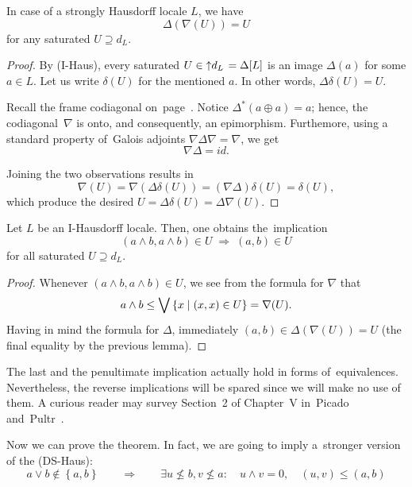 \begin{lem} \label{meets-in-satur}
  In case of a strongly Hausdorff locale $L$, we have
  \[
    \Delta(\nabla(U)) = U
  \]
  for any saturated $U \supseteq d_L$.
\end{lem}
\begin{proof}
  By (I-Haus), every saturated $U\in \left\uparrow d_L \right. = \Delta[L]$ is
  an image $\Delta(a)$ for some $a\in L$.
  Let us write $\delta(U)$ for the mentioned $a$.
  In other words, $\Delta\delta(U) = U$.

  Recall the frame codiagonal on~page~\pageref{codiag-in-Frm}\thinspace.
  Notice $\Delta^*(a \oplus a) = a$;
  hence, the codiagonal~$\nabla$ is onto, and consequently, an epimorphism.
  Furthemore, using a standard property of~Galois adjoints $\nabla \Delta
  \nabla = \nabla$,
  we get
  \[
    \nabla \Delta = id.
  \]

  Joining the two observations results in
  \[
    \nabla (U) = \nabla (\Delta\delta (U)) = (\nabla \Delta)\delta (U) = \delta(U),
  \]
  which produce the desired $U = \Delta \delta (U) = \Delta \nabla (U)$.
\end{proof}

\begin{lem} \label{meets-in-satur}
  Let $L$ be an I-Hausdorff locale.
  Then, one obtains the~implication
  \[
    \left( a \wedge b, a \wedge b \right) \in U
    \; \Rightarrow \;
    \left( a, b \right) \in U
  \]
  for all saturated $U \supseteq d_L$.
\end{lem}
\begin{proof}
  Whenever $(a \wedge b, a \wedge b)\in U$, we see from the formula for
  $\nabla$ that
  \[
    a \wedge b \leq \bigvee \left\{ x \mid (x, x) \in U \right\} = \nabla(U).
  \]
  Having in mind the formula for $\Delta$, immediately $(a, b) \in \Delta( \nabla(U) ) = U$
  (the final equality by the previous lemma).
\end{proof}

\begin{rem}
  The last and the penultimate implication actually hold in forms
  of~equivalences.
  Nevertheless, the reverse implications will be spared since we will make no
  use of them.
  A curious reader may survey Section~2 of Chapter~V in~Picado
  and~Pultr~\cite{picado-pultr12}.
\end{rem}

Now we can prove the theorem.
In fact, we are going to imply a~stronger version of the (DS-Haus):
\[
  a \vee b \not\in \left\{a, b\right\} \qquad \Rightarrow \qquad \exists
  u\not\leq b, v\not\leq a: \quad u \wedge v = 0, \quad \boxed{\left(u,
  v\right) \leq \left(a, b\right)}
\]

